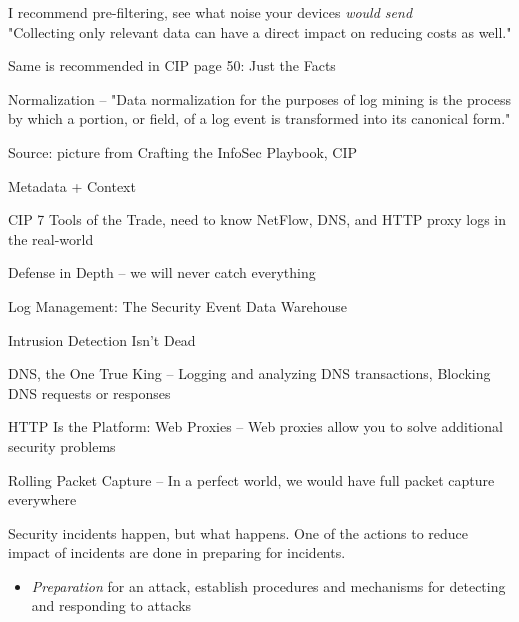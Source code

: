 \documentclass[Screen16to9,17pt]{foils}
\begin{document}
\begin{list2}
\item I recommend pre-filtering, see what noise your devices \emph{would send}\\
"Collecting only relevant data can have a direct impact on reducing costs as well."
\item Same is recommended in CIP page 50: Just the Facts
\item Normalization -- "Data normalization for
the purposes of log mining is the process by which a portion, or field, of a log event is
transformed into its canonical form."
\end{list2}



Source: picture from Crafting the InfoSec Playbook, CIP

Metadata + Context


\begin{list1}
\item CIP 7 Tools of the Trade, need to know NetFlow, DNS, and HTTP proxy logs in the real-world
\begin{list2}
\item Defense in Depth -- we will never catch everything
\item Log Management: The Security Event Data Warehouse
\item Intrusion Detection Isn’t Dead
\item DNS, the One True King -- Logging and analyzing DNS transactions, Blocking DNS requests or responses
\item HTTP Is the Platform: Web Proxies -- Web proxies allow you to solve additional security problems
\item Rolling Packet Capture -- In a perfect world, we would have full packet capture everywhere
\end{list2}
\end{list1}





Security incidents happen, but what happens. One of the actions to reduce impact of incidents are done in preparing for incidents.

\begin{itemize}
\item \emph{Preparation} for an attack, establish procedures and mechanisms for detecting and responding to attacks
\end{itemize}
\end{document}
